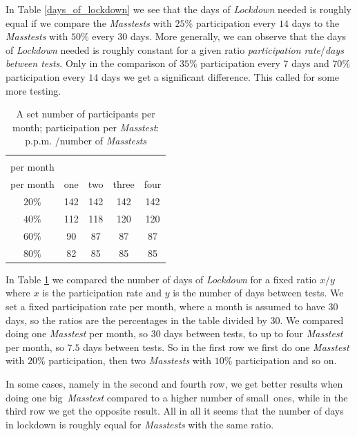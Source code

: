\documentclass
[
    report,
    11pt,
    bibliography = totoc,
    listof = totoc,
    headinclude = true,
]
{scrreport}
\begin{document}
In Table \ref{days_of_lockdown} we see that the days of \textit{Lockdown} needed is roughly equal if we compare the \textit{Masstests} with $25\%$ participation every $14$ days to the \textit{Masstests} with $50\%$ every $30$ days. More generally, we can observe that the days of \textit{Lockdown} needed is roughly constant for a given ratio \textit{participation rate}/\textit{days between tests}. Only in the comparison of $35\%$ participation every $7$ days and $70\%$ participation every $14$ days we get a significant difference. This called for some more testing.

\begin{table}[H]
\begin{center}
\begin{tabular}{|c||c|c|c|c|}
\hline
 \diagbox{participation\\ per month}{\textit{Masstests} \\per month}& one & two & three & four \\
 \hline
 \hline
 $20\%$ &142 & 142& 142& 142 \\
 \hline
 $40\%$ & 112 & 118 & 120 & 120 \\
 \hline
 $60\%$ & 90& 87& 87 & 87\\
 \hline
 $80\%$&  82 & 85& 85& 85\\
 \hline
\end{tabular}

\end{center}
  \caption{A set number of participants per month; participation per \textit{Masstest}: p.p.m. /number of \textit{Masstests}}
  \label{intervall_vs_teilnehmer}
\end{table}

In Table \ref{intervall_vs_teilnehmer} we compared the number of days of \textit{Lockdown} for a fixed ratio $x/y$ where $x$ is the participation rate and $y$ is the number of days between tests. We set a fixed participation rate per month, where a month is assumed to have 30 days, so the ratios are the percentages in the table divided by $30$. We compared doing one \textit{Masstest} per month, so $30$ days between tests, to up to four \textit{Masstest} per month, so $7.5$ days between tests. So in the first row we first do one \textit{Masstest} with $20\%$ participation, then two \textit{Masstests} with $10\%$ participation and so on.

In some cases, namely in the second and fourth row, we get better results when doing one \glqq big\grqq~\textit{Masstest} compared to a higher number of \glqq small\grqq~ones, while in the third row we get the opposite result. All in all it seems that the number of days in lockdown is roughly equal for \textit{Masstests} with the same ratio. \\
\end{document}

